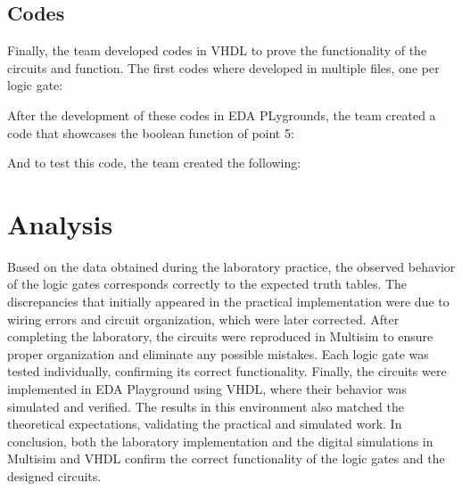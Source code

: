 \documentclass[12pt]{article}  %
\begin{document}
\subsection{Codes}
Finally, the team developed codes in VHDL to prove the functionality of the circuits and function.
The first codes where developed in multiple files, one per logic gate:







After the development of these codes in EDA PLygrounds, the team created a code that showcases the boolean function of point 5:

And to test this code, the team created the following:





\section{Analysis} %
Based on the data obtained during the laboratory practice, the observed behavior of the logic gates corresponds correctly to the expected truth tables. The discrepancies that initially appeared in the practical implementation were due to wiring errors and circuit organization, which were later corrected.
After completing the laboratory, the circuits were reproduced in Multisim to ensure proper organization and eliminate any possible mistakes. Each logic gate was tested individually, confirming its correct functionality. Finally, the circuits were implemented in EDA Playground using VHDL, where their behavior was simulated and verified. The results in this environment also matched the theoretical expectations, validating the practical and simulated work.
In conclusion, both the laboratory implementation and the digital simulations in Multisim and VHDL confirm the correct functionality of the logic gates and the designed circuits.
\end{document}

